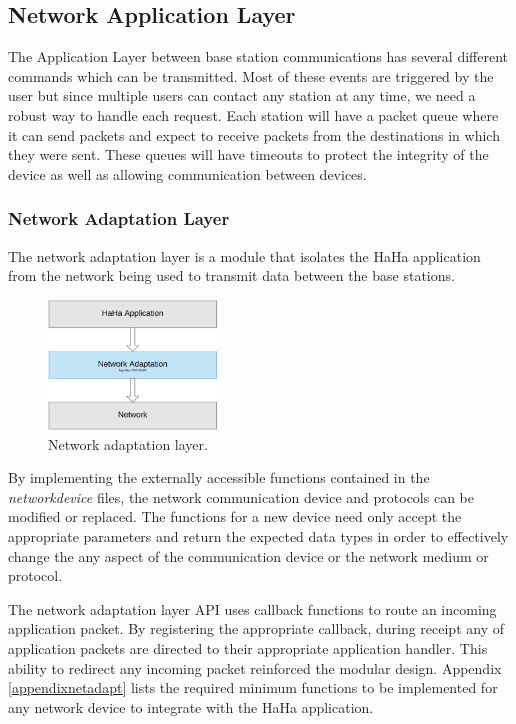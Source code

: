 \documentclass[journal,compsoc]{IEEEtran}
\begin{document}
\subsection{Network Application Layer}

The Application Layer between base station communications has several different commands which can be transmitted.  Most of these events are triggered by the user but since multiple users can contact any station at any time, we need a robust way to handle each request. 
Each station will have a packet queue where it can send packets and expect to receive packets from the destinations in which they were sent.  These queues will have timeouts to protect the integrity of the device as well as allowing communication between devices.

\subsubsection{Network Adaptation Layer}

The network adaptation layer is a module that isolates the HaHa application from the network being used to transmit data between the base stations. 

\begin{figure}[ht] 	%
\centering
\includegraphics[width=0.4\textwidth]{NetAdaptation.png}
\caption{ \space Network adaptation layer.}
\label{Network Adaptation}
\end{figure}

By implementing the externally accessible functions contained in the {\it networkdevice} files, the network communication device and protocols can be modified or replaced. The functions for a new device need only accept the appropriate parameters and return the expected data types in order to effectively change the any aspect of the communication device or the network medium or protocol.

The network adaptation layer API uses callback functions to route an incoming application packet. By registering the appropriate callback, during receipt any of application packets are directed to their appropriate application handler. This ability to redirect any incoming packet reinforced the modular design. Appendix \ref{appendixnetadapt} lists the required minimum functions to be implemented for any network device to integrate with the HaHa application.
\end{document}
